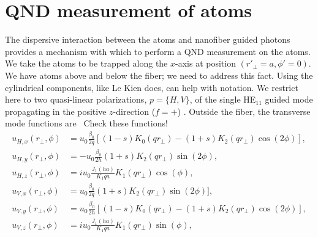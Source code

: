 \documentclass[preprint,aps,pra,onecolumn]{revtex4-1} %
\newcommand{\comment}[1]{{\color{Maroon} #1}}
\newcommand{\error}[1]{{\color{red} #1}}
\begin{document}
\section{QND measurement of atoms}
The dispersive interaction between the atoms and nanofiber guided photons provides a mechanism with which to perform a QND measurement on the atoms.  We take the atoms to be trapped along the $x$-axis at position $(r'_\perp =a, \phi' =0)$.  \comment{We have atoms above and below the fiber; we need to address this fact.  Using the cylindrical components, like Le Kien does, can help with notation.} We restrict here to two quasi-linear polarizations, $p =\{H,V\}$, of the single HE$_{11}$ guided mode \comment{ propagating in the positive $z$-direction ($f = +$) }.  Outside the fiber, the transverse mode functions are~\cite{tong_single-mode_2004,kien_field_2004} \error{Check these functions!}
\comment{
\begin{subequations} \label{Eq::NanofiberModes}
\begin{align}
u_{H,x}(r_\perp,\phi) &= u_0 \frac{\beta_0}{2 q}[(1-s)K_0(q r_\perp) - (1+s)K_2(q r_\perp) \cos(2 \phi)], \\
u_{H,y}(r_\perp,\phi) &=-u_0 \frac{\beta_0}{2 h}  (1+s)K_2(q r_\perp) \sin(2 \phi) ,\\
u_{H,z}(r_\perp,\phi) &=iu_0 \frac{J_1(ha)}{K_1{qa}} K_1(q r_\perp) \cos(\phi), \\
u_{V,x}(r_\perp,\phi) &= u_0 \frac{\beta_0}{2 q}(1+s)K_2(q r_\perp) \sin(2 \phi)] ,\\
u_{V,y}(r_\perp,\phi) &=u_0 \frac{\beta_0}{2 h} [(1-s)K_0(q r_\perp) - (1+s)K_2(q r_\perp) \cos(2 \phi)], \\
u_{V,z}(r_\perp,\phi) &=iu_0 \frac{J_1(ha)}{K_1{qa}}K_1(q r_\perp) \sin(\phi), 
\end{align}
\end{subequations}
}
\end{document}
